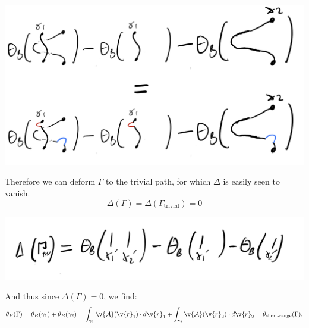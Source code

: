 \begin{center}
    \includegraphics[scale=0.3]{Lectures/Images/lec4-thetaBequiv.png}
\end{center}

Therefore we can deform $\Gamma$ to the trivial path, for which $\Delta$ is easily seen to vanish.
\begin{equation}
    \Delta(\Gamma) = \Delta(\Gamma_{\text{trivial}}) = 0
\end{equation}

\begin{center}
    \includegraphics[scale=0.3]{Lectures/Images/lec4-thetaBtriv.png}
\end{center}

And thus since $\Delta(\Gamma) = 0$, we find:
\begin{equation}
    \theta_B(\Gamma) = \theta_B(\gamma_1) + \theta_B(\gamma_2) = \int_{\gamma_1}\v{\mathcal{A}}(\v{r}_1) \cdot d\v{r}_1 + \int_{\gamma_2}\v{\mathcal{A}}(\v{r}_2) \cdot d\v{r}_2 = \theta_{\text{short-range}}(\Gamma).
\end{equation}
